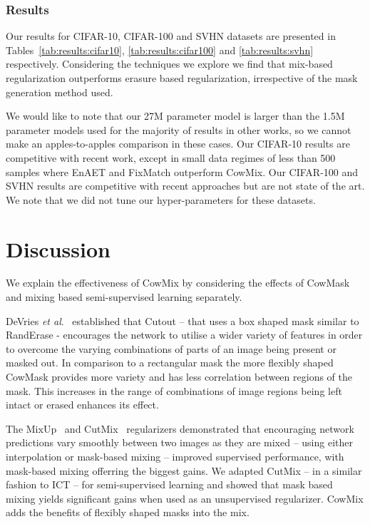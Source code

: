 \documentclass{article}
\newcommand{\etal}{\textit{et al}.}
\begin{document}
\subsubsection{Results}

Our results for CIFAR-10, CIFAR-100 and SVHN datasets are presented in Tables~\ref{tab:results:cifar10}, \ref{tab:results:cifar100} and \ref{tab:results:svhn} respectively. Considering the techniques we explore we find that mix-based regularization outperforms erasure based regularization, irrespective of the mask generation method used. 


We would like to note that our 27M parameter model is larger than the 1.5M parameter models used for the majority of results in other works, so we cannot make an apples-to-apples comparison in these cases. Our CIFAR-10 results are competitive with recent work, except in small data regimes of less than 500 samples where EnAET \cite{Wang:EnAET} and FixMatch \cite{Sohn:FixMatch} outperform CowMix. Our CIFAR-100 and SVHN results are competitive with recent approaches but are not state of the art. We note that we did not tune our hyper-parameters for these datasets.

\section{Discussion}
\label{sec:discussion}

We explain the effectiveness of CowMix by considering the effects of CowMask and mixing based semi-supervised
learning separately.

DeVries \etal~\cite{Devries:Cutout} established that Cutout -- that uses a box shaped mask similar to RandErase - encourages the network to utilise a wider variety of features in order to overcome the varying combinations of parts of an image being present or masked out. In comparison to a rectangular mask the more flexibly shaped CowMask provides more variety and has less correlation between regions of the mask. This increases in the range of combinations of image regions being left intact or erased enhances its effect.

The MixUp~\cite{Zhang:MixUp} and CutMix~\cite{Yun:CutMix} regularizers demonstrated that encouraging network predictions vary smoothly between two images as they are mixed -- using either interpolation or mask-based mixing -- improved supervised performance, with mask-based mixing offerring the biggest gains. We adapted CutMix -- in a similar fashion to ICT -- for semi-supervised learning and showed that mask based mixing yields significant gains when used as an unsupervised regularizer. CowMix adds the benefits of flexibly shaped masks into the mix.
\end{document}
